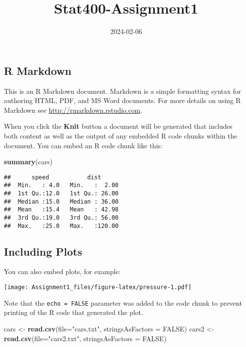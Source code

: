 \documentclass[
]{article}
\title{Stat400-Assignment1}
\author{}
\date{\vspace{-2.5em}2024-02-06}
\newenvironment{Shaded}{\begin{snugshade}}{\end{snugshade}}
\newcommand{\AttributeTok}[1]{\textcolor[rgb]{0.13,0.29,0.53}{#1}}
\newcommand{\ConstantTok}[1]{\textcolor[rgb]{0.56,0.35,0.01}{#1}}
\newcommand{\FunctionTok}[1]{\textcolor[rgb]{0.13,0.29,0.53}{\textbf{#1}}}
\newcommand{\NormalTok}[1]{#1}
\newcommand{\OtherTok}[1]{\textcolor[rgb]{0.56,0.35,0.01}{#1}}
\newcommand{\StringTok}[1]{\textcolor[rgb]{0.31,0.60,0.02}{#1}}
\begin{document}
\maketitle

\hypertarget{r-markdown}{%
\subsection{R Markdown}\label{r-markdown}}

This is an R Markdown document. Markdown is a simple formatting syntax
for authoring HTML, PDF, and MS Word documents. For more details on
using R Markdown see \url{http://rmarkdown.rstudio.com}.

When you click the \textbf{Knit} button a document will be generated
that includes both content as well as the output of any embedded R code
chunks within the document. You can embed an R code chunk like this:

\begin{Shaded}
\begin{Highlighting}[]
\FunctionTok{summary}\NormalTok{(cars)}
\end{Highlighting}
\end{Shaded}

\begin{verbatim}
##      speed           dist       
##  Min.   : 4.0   Min.   :  2.00  
##  1st Qu.:12.0   1st Qu.: 26.00  
##  Median :15.0   Median : 36.00  
##  Mean   :15.4   Mean   : 42.98  
##  3rd Qu.:19.0   3rd Qu.: 56.00  
##  Max.   :25.0   Max.   :120.00
\end{verbatim}

\hypertarget{including-plots}{%
\subsection{Including Plots}\label{including-plots}}

You can also embed plots, for example:

\texttt{[image: Assignment1\_files/figure-latex/pressure-1.pdf]}

Note that the \texttt{echo\ =\ FALSE} parameter was added to the code
chunk to prevent printing of the R code that generated the plot.

\begin{Shaded}
\begin{Highlighting}[]
\NormalTok{cars }\OtherTok{\textless{}{-}} \FunctionTok{read.csv}\NormalTok{(}\AttributeTok{file=}\StringTok{"cars.txt"}\NormalTok{, }\AttributeTok{stringsAsFactors =}
\ConstantTok{FALSE}\NormalTok{)}
\NormalTok{cars2 }\OtherTok{\textless{}{-}} \FunctionTok{read.csv}\NormalTok{(}\AttributeTok{file=}\StringTok{"cars2.txt"}\NormalTok{, }\AttributeTok{stringsAsFactors =}
\ConstantTok{FALSE}\NormalTok{)}
\end{Highlighting}
\end{Shaded}
\end{document}
